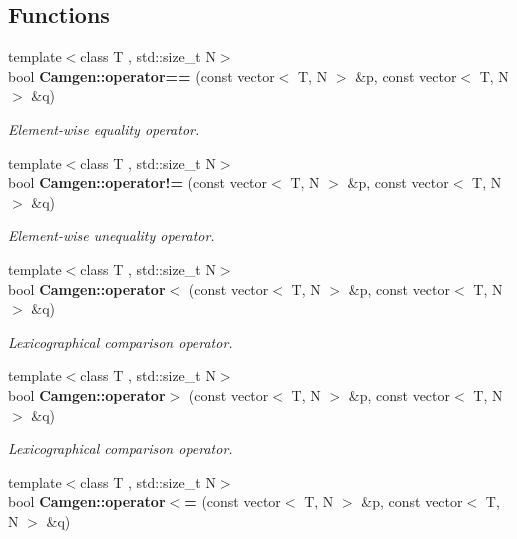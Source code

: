 \subsection*{Functions}
\begin{DoxyCompactItemize}
\item 
\hypertarget{a00878_ad87091437897510fb5b3148e2c025c13}{}{\footnotesize template$<$class T , std\+::size\+\_\+t N$>$ }\\bool {\bfseries Camgen\+::operator==} (const vector$<$ T, N $>$ \&p, const vector$<$ T, N $>$ \&q)\label{a00878_ad87091437897510fb5b3148e2c025c13}

\begin{DoxyCompactList}\small\item\em Element-\/wise equality operator. \end{DoxyCompactList}\item 
\hypertarget{a00878_af8ee7e609bab4684280db1256dde6cb7}{}{\footnotesize template$<$class T , std\+::size\+\_\+t N$>$ }\\bool {\bfseries Camgen\+::operator!=} (const vector$<$ T, N $>$ \&p, const vector$<$ T, N $>$ \&q)\label{a00878_af8ee7e609bab4684280db1256dde6cb7}

\begin{DoxyCompactList}\small\item\em Element-\/wise unequality operator. \end{DoxyCompactList}\item 
\hypertarget{a00878_afe05a43f050787e6718ca5e9107281b0}{}{\footnotesize template$<$class T , std\+::size\+\_\+t N$>$ }\\bool {\bfseries Camgen\+::operator$<$} (const vector$<$ T, N $>$ \&p, const vector$<$ T, N $>$ \&q)\label{a00878_afe05a43f050787e6718ca5e9107281b0}

\begin{DoxyCompactList}\small\item\em Lexicographical comparison operator. \end{DoxyCompactList}\item 
\hypertarget{a00878_a1b01a740e824187a9c3229c98f2be187}{}{\footnotesize template$<$class T , std\+::size\+\_\+t N$>$ }\\bool {\bfseries Camgen\+::operator$>$} (const vector$<$ T, N $>$ \&p, const vector$<$ T, N $>$ \&q)\label{a00878_a1b01a740e824187a9c3229c98f2be187}

\begin{DoxyCompactList}\small\item\em Lexicographical comparison operator. \end{DoxyCompactList}\item 
\hypertarget{a00878_a280d481a0fca42913f50d9875f7fb3f5}{}{\footnotesize template$<$class T , std\+::size\+\_\+t N$>$ }\\bool {\bfseries Camgen\+::operator$<$=} (const vector$<$ T, N $>$ \&p, const vector$<$ T, N $>$ \&q)\label{a00878_a280d481a0fca42913f50d9875f7fb3f5}


\end{DoxyCompactItemize}
